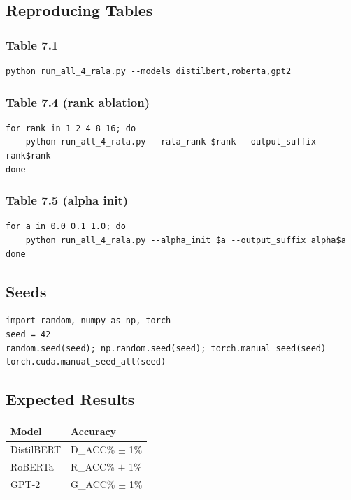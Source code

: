 \subsection{Reproducing Tables}

\subsubsection{Table 7.1}

\begin{lstlisting}
python run_all_4_rala.py --models distilbert,roberta,gpt2
\end{lstlisting}

\subsubsection{Table 7.4 (rank ablation)}

\begin{lstlisting}
for rank in 1 2 4 8 16; do
    python run_all_4_rala.py --rala_rank $rank --output_suffix rank$rank
done
\end{lstlisting}

\subsubsection{Table 7.5 (alpha init)}

\begin{lstlisting}
for a in 0.0 0.1 1.0; do
    python run_all_4_rala.py --alpha_init $a --output_suffix alpha$a
done
\end{lstlisting}

\subsection{Seeds}

\begin{lstlisting}
import random, numpy as np, torch
seed = 42
random.seed(seed); np.random.seed(seed); torch.manual_seed(seed)
torch.cuda.manual_seed_all(seed)
\end{lstlisting}

\subsection{Expected Results}

\begin{table}[H]
\centering
\small
\begin{tabular}{ll}
\toprule
\textbf{Model} & \textbf{Accuracy} \\
\midrule
DistilBERT & {{D\_ACC}}\% $\pm$ 1\% \\
RoBERTa & {{R\_ACC}}\% $\pm$ 1\% \\
GPT-2 & {{G\_ACC}}\% $\pm$ 1\% \\
\bottomrule
\end{tabular}
\end{table}

